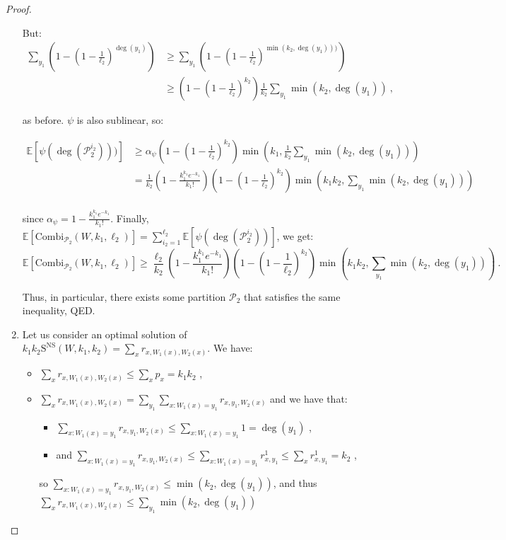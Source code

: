 \documentclass[11pt]{article}
\theoremstyle{definition}
\theoremstyle{remark}
\begin{document}
\begin{proof}
\begin{enumerate}
But:
\begin{equation}
  \begin{aligned}
    \sum_{y_1}\left(1-\left(1-\frac{1}{\ell_2}\right)^{\deg(y_1)}\right) &\geq \sum_{y_1}\left(1-\left(1-\frac{1}{\ell_2}\right)^{\min\left(k_2,\deg(y_1)\right))}\right)\\
    &\geq \left(1-\left(1-\frac{1}{\ell_2}\right)^{k_2}\right)\frac{1}{k_2}\sum_{y_1}\min\left(k_2,\deg(y_1)\right) \ ,
  \end{aligned}
\end{equation}

as before. $\psi$ is also sublinear, so:

\begin{equation}
  \begin{aligned}
    \mathbb{E}\left[\psi(\deg(\mathcal{P}_2^{i_2})))\right] &\geq \alpha_{\psi}\left(1-\left(1-\frac{1}{\ell_2}\right)^{k_2}\right)\min\left(k_1,\frac{1}{k_2}\sum_{y_1}\min\left(k_2,\deg(y_1)\right)\right)\\
    &= \frac{1}{k_2}\left(1 - \frac{k_1^{k_1}e^{-k_1}}{k_1!}\right)\left(1-\left(1-\frac{1}{\ell_2}\right)^{k_2}\right)\min\left(k_1k_2,\sum_{y_1}\min\left(k_2,\deg(y_1)\right)\right)\\
  \end{aligned}
\end{equation}

since $\alpha_{\psi} = 1 - \frac{k_1^{k_1}e^{-k_1}}{k_1!}$. Finally, $\mathbb{E}\left[\textrm{Combi}_{\mathcal{P}_2}(W,k_1,\ell_2)\right] = \sum_{i_2=1}^{\ell_2}\mathbb{E}\left[\psi(\deg(\mathcal{P}_2^{i_2}))\right]$, we get:
\[ \mathbb{E}\left[\textrm{Combi}_{\mathcal{P}_2}(W,k_1,\ell_2)\right] \geq \frac{\ell_2}{k_2}\left(1 - \frac{k_1^{k_1}e^{-k_1}}{k_1!}\right)\left(1-\left(1-\frac{1}{\ell_2}\right)^{k_2}\right)\min\left(k_1k_2,\sum_{y_1}\min\left(k_2,\deg(y_1)\right)\right) \ . \]

Thus, in particular, there exists some partition $\mathcal{P}_2$ that satisfies the same inequality, QED.

\item Let us consider an optimal solution of $k_1k_2\mathrm{S}^{\textrm{NS}}(W,k_1,k_2) = \sum_x r_{x,W_1(x),W_2(x)}$. We have:
  \begin{itemize}
  \item $\sum_x r_{x,W_1(x),W_2(x)} \leq \sum_x p_x = k_1k_2$ ,
  \item $\sum_x r_{x,W_1(x),W_2(x)} = \sum_{y_1}\sum_{x:W_1(x)=y_1} r_{x,y_1,W_2(x)}$ and we have that:
    \begin{itemize}
    \item $\sum_{x:W_1(x)=y_1} r_{x,y_1,W_2(x)} \leq \sum_{x:W_1(x)=y_1} 1 = \deg(y_1)$ ,
    \item and $\sum_{x:W_1(x)=y_1} r_{x,y_1,W_2(x)} \leq \sum_{x:W_1(x)=y_1} r^1_{x,y_1} \leq \sum_x r^1_{x,y_1} = k_2$ ,
    \end{itemize}
    so $\sum_{x:W_1(x)=y_1} r_{x,y_1,W_2(x)} \leq \min(k_2,\deg(y_1))$, and thus $\sum_x r_{x,W_1(x),W_2(x)} \leq \sum_{y_1}\min(k_2,\deg(y_1))$
  \end{itemize}


\end{enumerate}
\end{proof}
\end{document}
